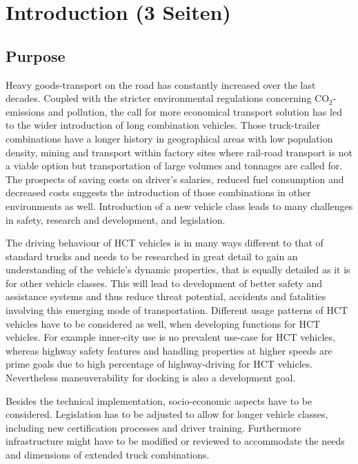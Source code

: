 \documentclass[ExampleMasters.tex]{subfiles}
\begin{document}
\clearpage
{\pagestyle{empty}\cleardoublepage}%
\chapter{Introduction (3 Seiten)}
\label{chap:introduction}

\section{Purpose}
\label{sec:purpose}
Heavy goods-transport on the road has constantly increased over the last decades. Coupled with the stricter environmental regulations concerning CO$_{2}$-emissions and pollution, the call for more economical transport solution has led to the wider introduction of long combination vehicles. Those truck-trailer combinations have a longer history in geographical areas with low population density, mining and transport within factory sites where rail-road transport is not a viable option but transportation of large volumes and tonnages are called for. The prospects of saving costs on driver's salaries, reduced fuel consumption and decreased costs suggests the introduction of those combinations in other environments as well. Introduction of a new vehicle class leads to many challenges in safety, research and development, and legislation. 

The driving behaviour of \gls{HCT} vehicles is in many ways different to that of standard trucks and needs to be researched in great detail to gain an understanding of the vehicle's dynamic properties, that is equally detailed as it is for other vehicle classes. This will lead to development of better safety and assistance systems and thus reduce threat potential, accidents and fatalities involving this emerging mode of transportation. Different usage patterns of \gls{HCT} vehicles have to be considered as well, when developing functions for \gls{HCT} vehicles. For example inner-city use is no prevalent use-case for \gls{HCT} vehicles, whereas highway safety features and handling properties at higher speeds are prime goals due to high percentage of highway-driving for \gls{HCT} vehicles. Nevertheless maneuverability for docking is also a development goal.

Besides the technical implementation, socio-economic aspects have to be considered. Legislation has to be adjusted to allow for longer vehicle classes, including new certification processes and driver training. Furthermore infrastructure might have to be modified or reviewed to accommodate the needs and dimensions of extended truck combinations.
\end{document}
